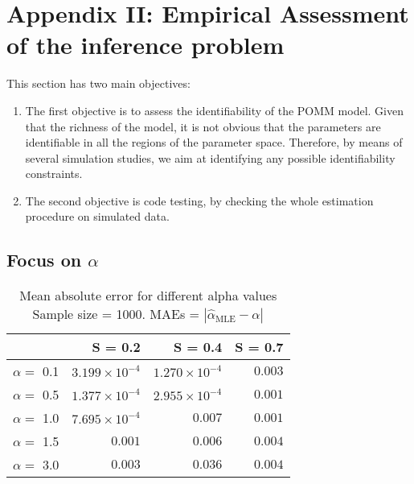 \documentclass[11pt]{amsart}
\begin{document}
\clearpage


\section{Appendix II: Empirical Assessment of the inference problem}

This section has two main objectives:

\begin{enumerate}
\item The first objective is to assess the identifiability of the POMM model. Given that the richness of the model, it is not obvious that the parameters are identifiable in all the regions of the parameter space. Therefore, by means of several simulation studies, we aim at identifying any possible identifiability constraints.
\item The second objective is code testing, by checking the whole estimation procedure on simulated data.
\end{enumerate}

\subsection{Focus on $\alpha$}
\begin{longtable}{l|rrr}
\caption{
{\large Mean absolute error for different alpha values} \\ 
{\small Sample size = 1000. MAEs = $|\hat{\alpha}_{\text{MLE}} - \alpha|$}
} \\ 
\toprule
\multicolumn{1}{l}{} & S = 0.2 & S = 0.4 & S = 0.7 \\ 
\midrule
$\alpha=$ 0.1 & $3.199 \times 10^{-4}$ & $1.270 \times 10^{-4}$ & $0.003$ \\ 
$\alpha=$ 0.5 & $1.377 \times 10^{-4}$ & $2.955 \times 10^{-4}$ & $0.001$ \\ 
$\alpha=$ 1.0 & $7.695 \times 10^{-4}$ & $0.007$ & $0.001$ \\ 
$\alpha=$ 1.5 & $0.001$ & $0.006$ & $0.004$ \\ 
$\alpha=$ 3.0 & $0.003$ & $0.036$ & $0.004$ \\ 
\bottomrule
\end{longtable}
\end{document}
